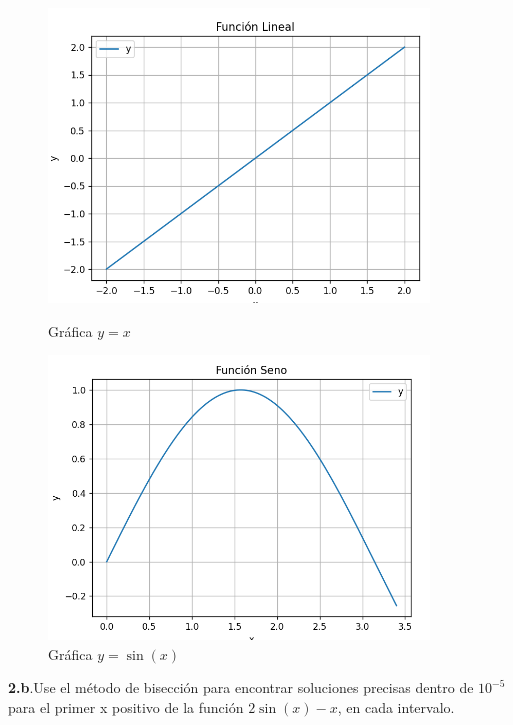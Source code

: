 \documentclass[12pt]{article}
\begin{document}
\begin{figure}[H]
    \centering
    \begin{minipage}{0.5\textwidth}
        \centering
        \includegraphics[width=0.9\textwidth]{./inFiles/Figures/Cap1.png}
        \caption{Gráfica \( y = x \)}
    \end{minipage}%
    \begin{minipage}{0.5\textwidth}
        \centering
        \includegraphics[width=0.9\textwidth]{./inFiles/Figures/Cap2.png}
        \caption{Gráfica \( y = \sin(x) \)}
    \end{minipage}
\end{figure}

\textbf{2.b}.Use el método de bisección para encontrar soluciones precisas dentro de $10^{-5}$ para el primer x positivo de la función $2\sin(x) - x$, en cada intervalo.
\end{document}
